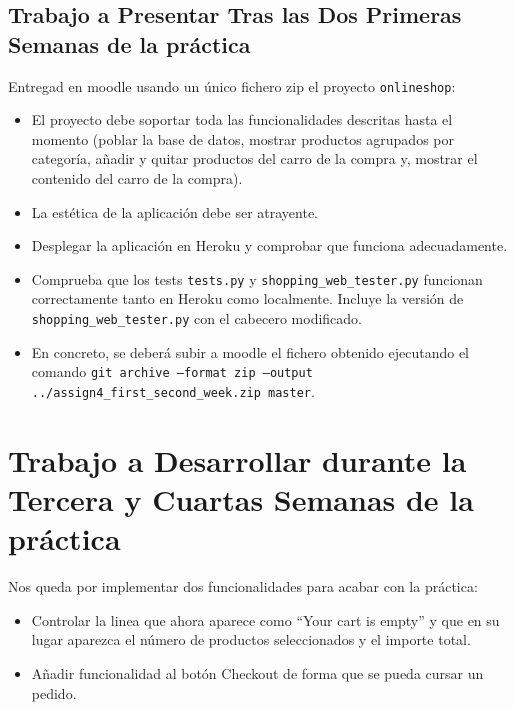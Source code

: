 \documentclass[12pt]{article} %
\newcounter{ejercicioNo}
\newcommand{\ttt}[1]{\texttt{#1}}%
\newcommand{\project}{\texttt{onlineshop}}%
\begin{document}
\subsection{Trabajo a Presentar Tras las Dos Primeras Semanas de la práctica} %

\begin{minipage}{\linewidth}
\begin{framed}
\addtocounter{ejercicioNo}{1} 

Entregad en moodle usando un único fichero zip el proyecto \project:
\begin{itemize}
 \item El proyecto debe soportar toda las funcionalidades descritas hasta el momento (poblar la base de datos, mostrar productos agrupados por categoría, añadir y quitar productos del carro de la compra y, mostrar el contenido del carro de la compra).
 \item La estética de la aplicación debe ser atrayente.
 \item Desplegar la aplicación en Heroku y comprobar que funciona adecuadamente. 
 \item Comprueba que los tests \ttt{tests.py} y \ttt{shopping\_web\_tester.py} funcionan correctamente tanto en Heroku como localmente. Incluye la versión de  \ttt{shopping\_web\_tester.py} con el cabecero modificado.
 \item En concreto, se deberá subir a moodle el fichero obtenido ejecutando el comando \texttt{git archive --format zip --output ../assign4\_first\_second\_week.zip  master}.

\end{itemize}
\end{framed}
\end{minipage}


\section{Trabajo a Desarrollar durante la Tercera y Cuartas Semanas de la práctica}

Nos queda por implementar dos funcionalidades para acabar con la práctica:

\begin{itemize}
 \item Controlar la linea que ahora aparece como ``Your cart is empty'' y que en su lugar aparezca el número de productos seleccionados y el importe total.
 \item Añadir funcionalidad al botón Checkout de forma que se pueda cursar un pedido.
\end{itemize}
\end{document}
